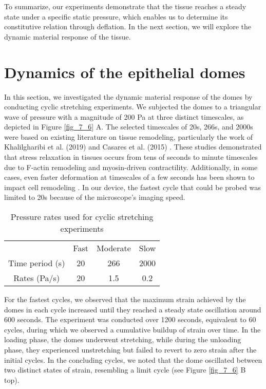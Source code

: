 To summarize, our experiments demonstrate that the tissue reaches a steady state under a specific static pressure, which enables us to determine its constitutive relation through deflation. In the next section, we will explore the dynamic material response of the tissue.

\vspace{0cm}

\hypertarget{dynamics-of-the-epithelia-domes}{\section{Dynamics of the epithelial domes}\label{dynamics-of-the-epithelial-domes}}




In this section, we investigated the dynamic material response of the domes by conducting cyclic stretching experiments. We subjected the domes to a triangular wave of pressure with a magnitude of 200 Pa at three distinct timescales, as depicted in Figure \ref{fig_7_6} A. The selected timescales of 20s, 266s, and 2000s were based on existing literature on tissue remodeling, particularly the work of Khalilgharibi et al. (2019) and Casares et al. (2015) \cite{khalilgharibi2019, casares2015}. These studies demonstrated that stress relaxation in tissues occurs from tens of seconds to minute timescales due to F-actin remodeling and myosin-driven contractility. Additionally, in some cases, even faster deformation at timescales of a few seconds has been shown to impact cell remodeling \cite{andreu2021a}. In our device, the fastest cycle that could be probed was limited to 20s because of the microscope’s imaging speed.

\begin{center}
	\begin{table}[h!]
		\label{tab:hysteresis}
		\centering
		\begin{tabular}{c c c c}
			& Fast & Moderate & Slow \\ 
			Time period (s) & 20   & 266      & 2000 \\ 
			Rates (Pa/s)    & 20   & 1.5      & 0.2  \\ 
		\end{tabular}
		\caption{Pressure rates used for cyclic stretching experiments}
	\end{table}
\end{center}

For the fastest cycles, we observed that the maximum strain achieved by the domes in each cycle increased until they reached a steady state oscillation around 600 seconds. The experiment was conducted over 1200 seconds, equivalent to 60 cycles, during which we observed a cumulative buildup of strain over time. In the loading phase, the domes underwent stretching, while during the unloading phase, they experienced unstretching but failed to revert to zero strain after the initial cycles. In the concluding cycles, we noted that the dome oscillated between two distinct states of strain, resembling a limit cycle (see Figure \ref{fig_7_6} B top).

